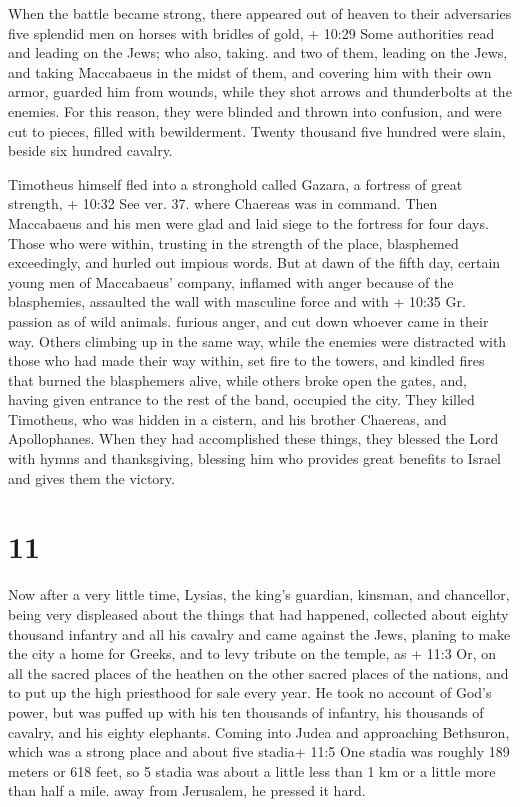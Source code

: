  When the battle became strong, there appeared out of
heaven to their adversaries five splendid men on horses with bridles of
gold, + 10:29 Some authorities read and leading on the Jews; who also,
taking. and two of them, leading on the Jews,  and taking
Maccabaeus in the midst of them, and covering him with their own armor,
guarded him from wounds, while they shot arrows and thunderbolts at the
enemies. For this reason, they were blinded and thrown into confusion,
and were cut to pieces, filled with bewilderment.  Twenty
thousand five hundred were slain, beside six hundred cavalry.

 Timotheus himself fled into a stronghold called Gazara, a
fortress of great strength, + 10:32 See ver. 37. where Chaereas was in
command.  Then Maccabaeus and his men were glad and laid
siege to the fortress for four days.  Those who were
within, trusting in the strength of the place, blasphemed exceedingly,
and hurled out impious words.  But at dawn of the fifth
day, certain young men of Maccabaeus' company, inflamed with anger
because of the blasphemies, assaulted the wall with masculine force and
with + 10:35 Gr. passion as of wild animals. furious anger, and cut down
whoever came in their way.  Others climbing up in the same
way, while the enemies were distracted with those who had made their way
within, set fire to the towers, and kindled fires that burned the
blasphemers alive, while others broke open the gates, and, having given
entrance to the rest of the band, occupied the city.  They
killed Timotheus, who was hidden in a cistern, and his brother Chaereas,
and Apollophanes.  When they had accomplished these things,
they blessed the Lord with hymns and thanksgiving, blessing him who
provides great benefits to Israel and gives them the victory.

\hypertarget{section-9}{%
\section{11}\label{section-9}}

 Now after a very little time, Lysias, the king's guardian,
kinsman, and chancellor, being very displeased about the things that had
happened,  collected about eighty thousand infantry and all
his cavalry and came against the Jews, planing to make the city a home
for Greeks,  and to levy tribute on the temple, as + 11:3
Or, on all the sacred places of the heathen on the other sacred places
of the nations, and to put up the high priesthood for sale every year.
 He took no account of God's power, but was puffed up with
his ten thousands of infantry, his thousands of cavalry, and his eighty
elephants.  Coming into Judea and approaching Bethsuron,
which was a strong place and about five stadia+ 11:5 One stadia was
roughly 189 meters or 618 feet, so 5 stadia was about a little less than
1 km or a little more than half a mile. away from Jerusalem, he pressed
it hard.

